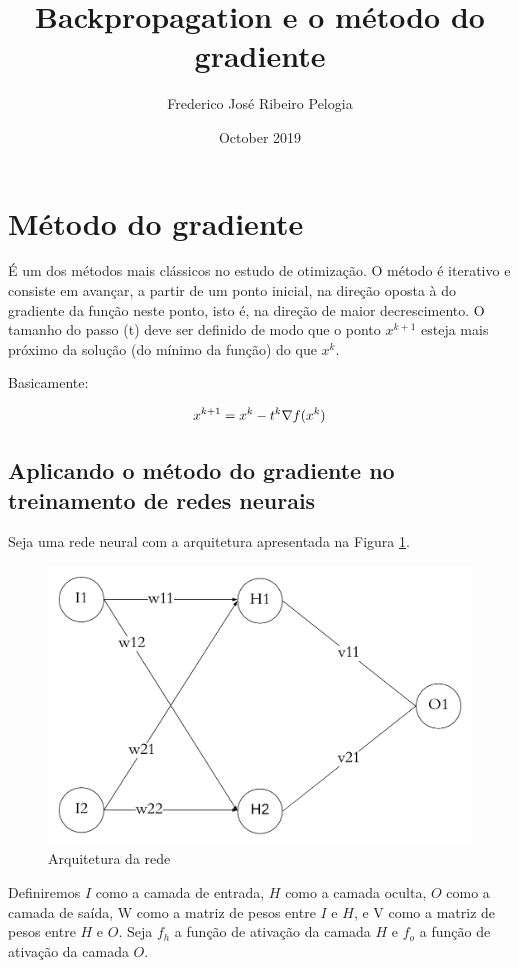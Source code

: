\documentclass{article}
\title{Backpropagation e o método do gradiente}
\author{Frederico José Ribeiro Pelogia}
\date{October 2019}
\begin{document}
\maketitle
\section{Método do gradiente}

É um dos métodos mais clássicos no estudo de otimização. O método é iterativo e consiste em avançar, a partir de um ponto inicial, na direção oposta à do gradiente da função neste ponto, isto é, na direção de maior decrescimento. O tamanho do passo (t) deve ser definido de modo que o ponto $x^{k+1}$ esteja mais próximo da solução (do mínimo da função) do que $x^k$.

Basicamente:

$$
    \large x^{k+1} = x^k - t^k \nabla f(x^k)
$$
\subsection{Aplicando o método do gradiente no treinamento de redes neurais} \label{mgradnn}

Seja uma rede neural com a arquitetura apresentada na Figura \ref{fig:network}.

\begin{figure}[h]
\centering 
\includegraphics[scale = 0.3]{network.png}
\caption{Arquitetura da rede} \label{fig:network}
\end{figure}

Definiremos $I$ como a camada de entrada, $H$ como a camada oculta, $O$ como a camada de saída, W como a matriz de pesos entre $I$ e $H$, e V como a matriz de pesos entre $H$ e $O$. Seja $f_{h}$ a função de ativação da camada $H$ e $f_{o}$ a função de ativação da camada $O$.
\end{document}
